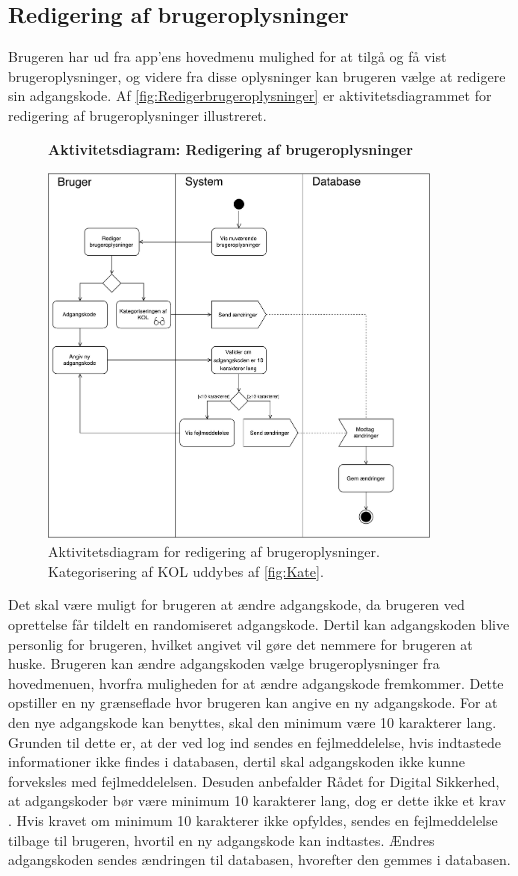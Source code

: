 \subsection*{Redigering af brugeroplysninger} \label{sec:redigrering}
Brugeren har ud fra app'ens hovedmenu mulighed for at tilgå og få vist brugeroplysninger, og videre fra disse oplysninger kan brugeren vælge at redigere sin adgangskode. Af \autoref{fig:Redigerbrugeroplysninger} er aktivitetsdiagrammet for redigering af brugeroplysninger illustreret. 

\begin{figure}[H]
\centering
\textbf{Aktivitetsdiagram: Redigering af brugeroplysninger}\par\medskip
\includegraphics[width=0.9\textwidth]{figures/aktivitetsdiagram/Redigerbrugeroplysninger}
\caption{Aktivitetsdiagram for redigering af brugeroplysninger. Kategorisering af KOL uddybes af \autoref{fig:Kate}.}
\label{fig:Redigerbrugeroplysninger}
\end{figure}

\noindent
Det skal være muligt for brugeren at ændre adgangskode, da brugeren ved oprettelse får tildelt en randomiseret adgangskode. Dertil kan adgangskoden blive personlig for brugeren, hvilket angivet vil gøre det nemmere for brugeren at huske. 
Brugeren kan ændre adgangskoden vælge brugeroplysninger fra hovedmenuen, hvorfra muligheden for at ændre adgangskode fremkommer. Dette opstiller en ny grænseflade hvor brugeren kan angive en ny adgangskode.  
For at den nye adgangskode kan benyttes, skal den minimum være 10 karakterer lang. Grunden til dette er, at der ved log ind sendes en fejlmeddelelse, hvis indtastede informationer ikke findes i databasen, dertil skal adgangskoden ikke kunne forveksles med fejlmeddelelsen. Desuden anbefalder Rådet for Digital Sikkerhed, at adgangskoder bør være minimum 10 karakterer lang, dog er dette ikke et krav \citep{sikkerhed2015}.
Hvis kravet om minimum 10 karakterer ikke opfyldes, sendes en fejlmeddelelse tilbage til brugeren, hvortil en ny adgangskode kan indtastes. 
Ændres adgangskoden sendes ændringen til databasen, hvorefter den gemmes i databasen.
